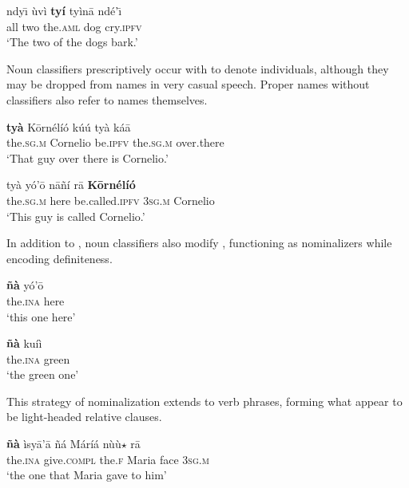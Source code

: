 \documentclass[output=paper,modfonts,nonflat]{langsci/langscibook}
\begin{document}
\ea {}\label{ex:cisneros:50}
\gll
{\ob}ndy\=\i{} \`uv\`i \textbf{ty\'i} ty\`in\=a{\cb} nd\'e'\=\i\\
{\db}all two the.\textsc{aml} dog cry.\textsc{ipfv}\\
\glt
`The two of the dogs bark.'
\z 

Noun classifiers prescriptively occur with  to denote individuals, although they may be dropped from names in very casual speech.  Proper names without classifiers also refer to names themselves.

\ea {}\label{ex:cisneros:51}
\gll
{\ob}{\op}\textbf{ty\`a}{\cp} K\=orn\'el\'i\'o{\cb} k\'u\'u {\ob}ty\`a k\'a\=a{\cb}\\
\phantom{[(}the.\textsc{sg.m} Cornelio be.\textsc{ipfv} {\db}the.\textsc{sg.m} over.there\\
\glt
`That guy over there is Cornelio.'
\z 

\ea {}\label{ex:cisneros:52}
\gll
{\ob}ty\`a y\'o'\=o{\cb} n\=a\~n\'i r\=a \textbf{K\=orn\'el\'i\'o}\\
{\db}the.\textsc{sg.m} here be.called.\textsc{ipfv} 3\textsc{sg.m} Cornelio\\
\glt
`This guy is called Cornelio.'
\z 

In addition to , noun classifiers also modify , functioning as nominalizers while encoding definiteness.  

\ea {}\label{ex:cisneros:53}
\gll
\textbf{\~n\`a} y\'o'\=o\\
the.\textsc{ina} here\\
\glt
`this one here'
\z 

\ea {}\label{ex:cisneros:54}
\gll
\textbf{\~n\`a} ku\'i\`i\\
the.\textsc{ina} green\\
\glt
`the green one'
\z 

This strategy of nominalization extends to verb phrases, forming what appear to be light-headed relative clauses.

\begin{exe}
\ex \label{ex:cisneros:55}
\gll
\textbf{\~n\`a} \`isy\=a'\=a {\ob}\~n\'a M\'ar\'i\'a{\cb} {\ob}n\`u\`u$\star$ r\=a{\cb}\\
the.\textsc{ina} give.\textsc{compl} {\db}the.\textsc{f} Maria {\db}face 3\textsc{sg.m}\\
\glt
`the one that Maria gave to him'
\end{exe}
\end{document}
